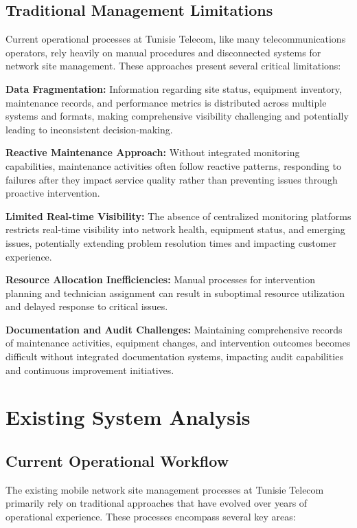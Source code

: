 \subsection{Traditional Management Limitations}

Current operational processes at Tunisie Telecom, like many telecommunications operators, rely heavily on manual procedures and disconnected systems for network site management. These approaches present several critical limitations:

\textbf{Data Fragmentation:} Information regarding site status, equipment inventory, maintenance records, and performance metrics is distributed across multiple systems and formats, making comprehensive visibility challenging and potentially leading to inconsistent decision-making.

\textbf{Reactive Maintenance Approach:} Without integrated monitoring capabilities, maintenance activities often follow reactive patterns, responding to failures after they impact service quality rather than preventing issues through proactive intervention.

\textbf{Limited Real-time Visibility:} The absence of centralized monitoring platforms restricts real-time visibility into network health, equipment status, and emerging issues, potentially extending problem resolution times and impacting customer experience.

\textbf{Resource Allocation Inefficiencies:} Manual processes for intervention planning and technician assignment can result in suboptimal resource utilization and delayed response to critical issues.

\textbf{Documentation and Audit Challenges:} Maintaining comprehensive records of maintenance activities, equipment changes, and intervention outcomes becomes difficult without integrated documentation systems, impacting audit capabilities and continuous improvement initiatives.

\section{Existing System Analysis}

\subsection{Current Operational Workflow}

The existing mobile network site management processes at Tunisie Telecom primarily rely on traditional approaches that have evolved over years of operational experience. These processes encompass several key areas:

